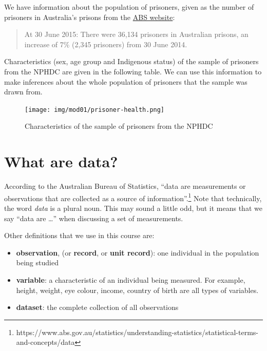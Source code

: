 \documentclass[
  a4paper,
]{memoir}
\providecommand{\tightlist}{%
  \setlength{\itemsep}{0pt}\setlength{\parskip}{0pt}}\usepackage{longtable,booktabs,array}
\begin{document}
We have information about the population of prisoners, given as the
number of prisoners in Australia's prisons from the
\href{http://www.abs.gov.au/ausstats/abs@.nsf/Lookup/by\%20Subject/4517.0~2015~Main\%20Features~Prisoner\%20characteristics,\%20Australia~28}{ABS
website}:

\begin{quote}
At 30 June 2015: There were 36,134 prisoners in Australian prisons, an
increase of 7\% (2,345 prisoners) from 30 June 2014.
\end{quote}

Characteristics (sex, age group and Indigenous status) of the sample of
prisoners from the NPHDC are given in the following table. We can use
this information to make inferences about the whole population of
prisoners that the sample was drawn from.

\begin{figure}[H]

{\centering \texttt{[image: img/mod01/prisoner-health.png]}

}

\caption{\label{fig-1-2}Characteristics of the sample of prisoners from
the NPHDC}

\end{figure}

\hypertarget{what-are-data}{%
\section{What are data?}\label{what-are-data}}

According to the Australian Bureau of Statistics, ``data are
measurements or observations that are collected as a source of
information''.\footnote{https://www.abs.gov.au/statistics/understanding-statistics/statistical-terms-and-concepts/data}
Note that technically, the word \emph{data} is a plural noun. This may
sound a little odd, but it means that we say ``data are \ldots{}'' when
discussing a set of measurements.

Other definitions that we use in this course are:

\begin{itemize}
\tightlist
\item
  \textbf{observation}, (or \textbf{record}, or \textbf{unit record}):
  one individual in the population being studied
\item
  \textbf{variable}: a characteristic of an individual being measured.
  For example, height, weight, eye colour, income, country of birth are
  all types of variables.
\item
  \textbf{dataset}: the complete collection of all observations
\end{itemize}
\end{document}

